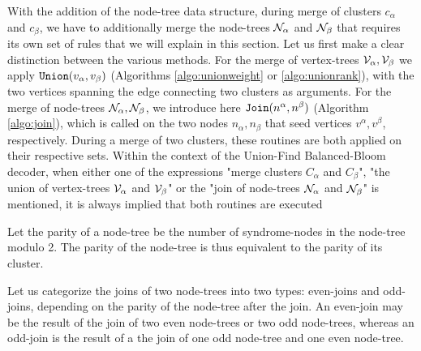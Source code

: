 With the addition of the node-tree data structure, during merge of clusters $c_\alpha$ and $c_\beta$, we have to additionally merge the node-trees $\mathcal{N}_{\alpha}$ and $\mathcal{N}_\beta$ that requires its own set of rules that we will explain in this section. Let us first make a clear distinction between the various methods. For the merge of vertex-trees $\mathcal{V}_\alpha, \mathcal{V}_\beta$ we apply $\texttt{Union}(v_\alpha, v_\beta)$ (Algorithms \ref{algo:unionweight} or \ref{algo:unionrank}), with the two vertices spanning the edge connecting two clusters as arguments. For the merge of node-trees $\mathcal{N}_\alpha, \mathcal{N}_\beta$, we introduce here $\texttt{Join}(n^\alpha, n^\beta)$ (Algorithm \ref{algo:join}), which is called on the two nodes $n_\alpha, n_\beta$ that seed vertices $v^\alpha, v^\beta$, respectively. During a merge of two clusters, these routines are both applied on their respective sets. Within the context of the Union-Find Balanced-Bloom decoder, when either one of the expressions "merge clusters $C_\alpha$ and $C_\beta$", "the union of vertex-trees $\mathcal{V}_\alpha$ and $\mathcal{V}_\beta$" or the "join of node-trees $\mathcal{N}_{\alpha}$ and $\mathcal{N}_\beta$" is mentioned, it is always implied that both routines are executed

\begin{definition}\label{def:nodesetparity}
  Let the parity of a node-tree be the number of syndrome-nodes in the node-tree modulo 2. The parity of the node-tree is thus equivalent to the parity of its cluster. 
\end{definition}
\begin{definition}\label{def:oddevenjoin}
  Let us categorize the joins of two node-trees into two types: even-joins and odd-joins, depending on the parity of the node-tree after the join. An even-join may be the result of the join of two even node-trees or two odd node-trees, whereas an odd-join is the result of a the join of one odd node-tree and one even node-tree.
\end{definition}


